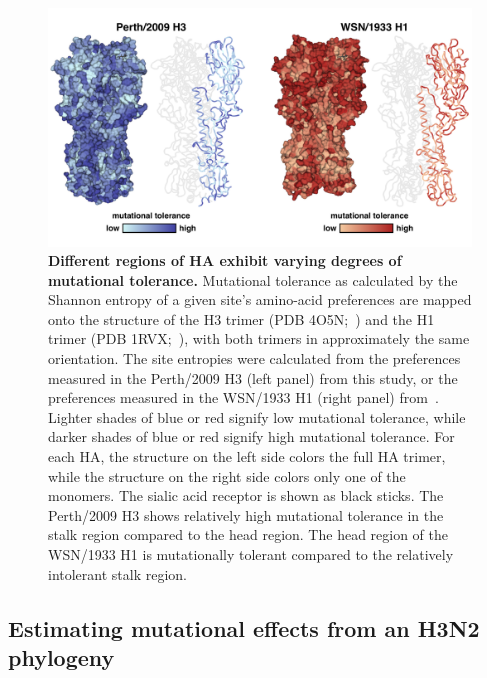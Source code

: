 \documentclass[11pt]{article}
\begin{document}
\begin{figure}
\centerline{\includegraphics[width=\textwidth]{figs/mut_tolerance/entropy_heatmap.pdf}}
\caption{\label{fig:mut_tolerance}
{\bf Different regions of HA exhibit varying degrees of mutational tolerance.}
Mutational tolerance as calculated by the Shannon entropy of a given site's amino-acid preferences are mapped onto the structure of the H3 trimer (PDB 4O5N;~\cite{lee2014receptor}) and the H1 trimer (PDB 1RVX;~\cite{gamblin2004structure}), with both trimers in approximately the same orientation. 
The site entropies were calculated from the preferences measured in the Perth/2009 H3 (left panel) from this study, or the preferences measured in the WSN/1933 H1 (right panel) from~\cite{doud2016accurate}. 
Lighter shades of blue or red signify low mutational tolerance, while darker shades of blue or red signify high mutational tolerance. 
For each HA, the structure on the left side colors the full HA trimer, while the structure on the right side colors only one of the monomers.
The sialic acid receptor is shown as black sticks.
The Perth/2009 H3 shows relatively high mutational tolerance in the stalk region compared to the head region. 
The head region of the WSN/1933 H1 is mutationally tolerant compared to the relatively intolerant stalk region. 
}
\end{figure}

\subsection*{Estimating mutational effects from an H3N2 phylogeny}
\end{document}
